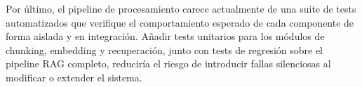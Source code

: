 Por último, el pipeline de procesamiento carece actualmente de una suite de tests automatizados que verifique el comportamiento esperado de cada componente de forma aislada y en integración. Añadir tests unitarios para los módulos de chunking, embedding y recuperación, junto con tests de regresión sobre el pipeline RAG completo, reduciría el riesgo de introducir fallas silenciosas al modificar o extender el sistema.


